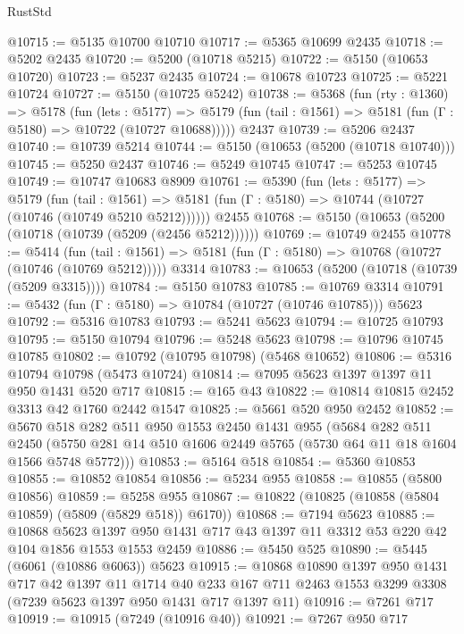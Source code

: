 \begin{lexlean}{RustStd}
\begin{coremodule}
@10715 := @5135 @10700 @10710
@10717 := @5365 @10699 @2435
@10718 := @5202 @2435
@10720 := @5200 (@10718 @5215)
@10722 := @5150 (@10653 @10720)
@10723 := @5237 @2435
@10724 := @10678 @10723
@10725 := @5221 @10724
@10727 := @5150 (@10725 @5242)
@10738 := @5368
    (fun (rty : @1360) =>
    @5178
      (fun (lets : @5177) =>
      @5179 (fun (tail : @1561) => @5181 (fun (Γ : @5180) => @10722 (@10727 @10688)))))
    @2437
@10739 := @5206 @2437
@10740 := @10739 @5214
@10744 := @5150 (@10653 (@5200 (@10718 @10740)))
@10745 := @5250 @2437
@10746 := @5249 @10745
@10747 := @5253 @10745
@10749 := @10747 @10683 @8909
@10761 := @5390
    (fun (lets : @5177) =>
    @5179
      (fun (tail : @1561) =>
      @5181 (fun (Γ : @5180) => @10744 (@10727 (@10746 (@10749 @5210 @5212))))))
    @2455
@10768 := @5150 (@10653 (@5200 (@10718 (@10739 (@5209 (@2456 @5212))))))
@10769 := @10749 @2455
@10778 := @5414
    (fun (tail : @1561) => @5181 (fun (Γ : @5180) => @10768 (@10727 (@10746 (@10769 @5212)))))
    @3314
@10783 := @10653 (@5200 (@10718 (@10739 (@5209 @3315))))
@10784 := @5150 @10783
@10785 := @10769 @3314
@10791 := @5432 (fun (Γ : @5180) => @10784 (@10727 (@10746 @10785))) @5623
@10792 := @5316 @10783
@10793 := @5241 @5623
@10794 := @10725 @10793
@10795 := @5150 @10794
@10796 := @5248 @5623
@10798 := @10796 @10745 @10785
@10802 := @10792 (@10795 @10798) (@5468 @10652)
@10806 := @5316 @10794 @10798 (@5473 @10724)
@10814 := @7095 @5623 @1397 @1397 @11 @950 @1431 @520 @717
@10815 := @165 @43
@10822 := @10814 @10815 @2452 @3313 @42 @1760 @2442 @1547
@10825 := @5661 @520 @950 @2452
@10852 := @5670
    @518
    @282
    @511
    @950
    @1553
    @2450
    @1431
    @955
    (@5684
      @282
      @511
      @2450
      (@5750 @281 @14 @510 @1606 @2449 @5765 (@5730 @64 @11 @18 @1604 @1566 @5748 @5772)))
@10853 := @5164 @518
@10854 := @5360 @10853
@10855 := @10852 @10854
@10856 := @5234 @955
@10858 := @10855 (@5800 @10856)
@10859 := @5258 @955
@10867 := @10822 (@10825 (@10858 (@5804 @10859) (@5809 (@5829 @518)) @6170))
@10868 := @7194 @5623
@10885 := @10868
    @5623
    @1397
    @950
    @1431
    @717
    @43
    @1397
    @11
    @3312
    @53
    @220
    @42
    @104
    @1856
    @1553
    @1553
    @2459
@10886 := @5450 @525
@10890 := @5445 (@6061 (@10886 @6063)) @5623
@10915 := @10868
    @10890
    @1397
    @950
    @1431
    @717
    @42
    @1397
    @11
    @1714
    @40
    @233
    @167
    @711
    @2463
    @1553
    @3299
    @3308
    (@7239 @5623 @1397 @950 @1431 @717 @1397 @11)
@10916 := @7261 @717
@10919 := @10915 (@7249 (@10916 @40))
@10921 := @7267 @950 @717

\end{coremodule}
\end{lexlean}
